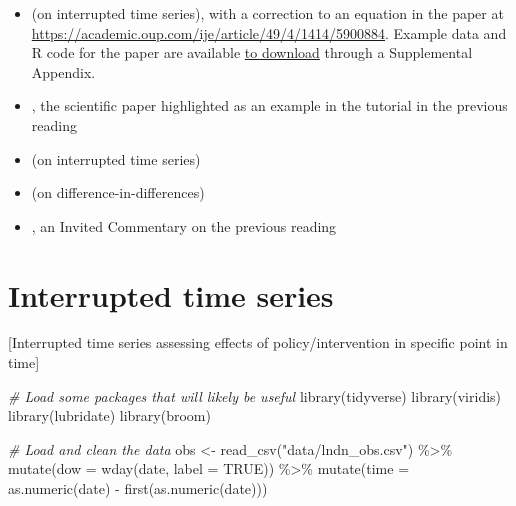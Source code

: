 \documentclass[
]{book}
\newenvironment{Shaded}{\begin{snugshade}}{\end{snugshade}}
\newcommand{\AttributeTok}[1]{\textcolor[rgb]{0.77,0.63,0.00}{#1}}
\newcommand{\CommentTok}[1]{\textcolor[rgb]{0.56,0.35,0.01}{\textit{#1}}}
\newcommand{\ConstantTok}[1]{\textcolor[rgb]{0.00,0.00,0.00}{#1}}
\newcommand{\FunctionTok}[1]{\textcolor[rgb]{0.00,0.00,0.00}{#1}}
\newcommand{\NormalTok}[1]{#1}
\newcommand{\OtherTok}[1]{\textcolor[rgb]{0.56,0.35,0.01}{#1}}
\newcommand{\SpecialCharTok}[1]{\textcolor[rgb]{0.00,0.00,0.00}{#1}}
\newcommand{\StringTok}[1]{\textcolor[rgb]{0.31,0.60,0.02}{#1}}
\providecommand{\tightlist}{%
  \setlength{\itemsep}{0pt}\setlength{\parskip}{0pt}}
\begin{document}
\begin{itemize}
\tightlist
\item
  \citet{bernal2017interrupted} (on interrupted time series), with a correction to an equation in the paper at \url{https://academic.oup.com/ije/article/49/4/1414/5900884}. Example data and R code for the paper are available \href{https://oup.silverchair-cdn.com/oup/backfile/Content_public/Journal/ije/49/4/10.1093_ije_dyaa118/1/dyaa118_supplementary_data.zip?Expires=1623897009\&Signature=BzYQrBg60cMKHYeDU~OIZYIFuRgEIPwQsWMjzON0dB~fL8y-8x4xdGIJQBBPgDxBIoUIGnjmShVf1jlVqzloo3IldAdVC78TZ~~XseYdJ9c590QRAR6m7mH~VbPe-fCnQSnZF0z2Qw9PZcSGITZeNr4YXPVY-~gtpgBeZiN0MpgEVBLVT5fYhhQBGbp0vxl1bKdUfNtF71fdVJrglkhSG8-M24A07LmAr8jThx4MQmSAzKCxA4VZLRE6To8zC3-rJlxyWiqrSTFsVQM2SN4R6UuxYoRsILRcIAr2sUfqgmaSlxBiYAf71PdGSrnBcXX3l0l7yuAftX5PYTwMKTyxOA__\&Key-Pair-Id=APKAIE5G5CRDK6RD3PGA}{to download} through a Supplemental Appendix.
\item
  \citet{barone2011effects}, the scientific paper highlighted as an example in the tutorial in the previous reading
\item
  \citet{bor2014regression} (on interrupted time series)
\item
  \citet{casey2018retirements} (on difference-in-differences)
\item
  \citet{mendola2018invited}, an Invited Commentary on the previous reading
\end{itemize}

\hypertarget{interrupted-time-series}{%
\section{Interrupted time series}\label{interrupted-time-series}}

{[}Interrupted time series assessing effects of policy/intervention in specific point in time{]}

\begin{Shaded}
\begin{Highlighting}[]
\CommentTok{\# Load some packages that will likely be useful}
\FunctionTok{library}\NormalTok{(tidyverse)}
\FunctionTok{library}\NormalTok{(viridis)}
\FunctionTok{library}\NormalTok{(lubridate)}
\FunctionTok{library}\NormalTok{(broom)}

\CommentTok{\# Load and clean the data}
\NormalTok{obs }\OtherTok{\textless{}{-}} \FunctionTok{read\_csv}\NormalTok{(}\StringTok{"data/lndn\_obs.csv"}\NormalTok{) }\SpecialCharTok{\%\textgreater{}\%} 
  \FunctionTok{mutate}\NormalTok{(}\AttributeTok{dow =} \FunctionTok{wday}\NormalTok{(date, }\AttributeTok{label =} \ConstantTok{TRUE}\NormalTok{)) }\SpecialCharTok{\%\textgreater{}\%} 
  \FunctionTok{mutate}\NormalTok{(}\AttributeTok{time =} \FunctionTok{as.numeric}\NormalTok{(date) }\SpecialCharTok{{-}} \FunctionTok{first}\NormalTok{(}\FunctionTok{as.numeric}\NormalTok{(date)))}
\end{Highlighting}
\end{Shaded}
\end{document}
